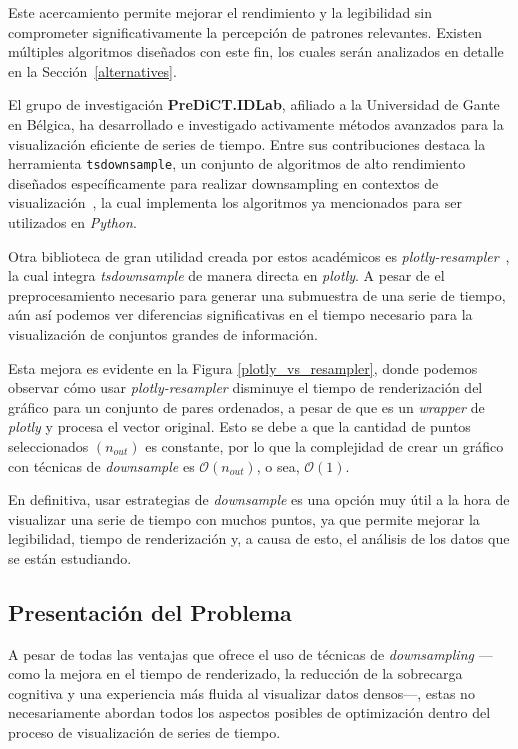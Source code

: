 Este acercamiento permite mejorar el rendimiento y la legibilidad sin comprometer significativamente la percepción de patrones relevantes. Existen múltiples algoritmos diseñados con este fin, los cuales serán analizados en detalle en la Sección~\ref{alternatives}.

\squashedplot
\downsample

El grupo de investigación \textbf{PreDiCT.IDLab}\cite{predict2025}, afiliado a la Universidad de Gante en Bélgica, ha desarrollado e investigado activamente métodos avanzados para la visualización eficiente de series de tiempo. Entre sus contribuciones destaca la herramienta \texttt{tsdownsample}, un conjunto de algoritmos de alto rendimiento diseñados específicamente para realizar downsampling en contextos de visualización~\cite{tsdownsample}, la cual implementa los algoritmos ya mencionados para ser utilizados en \textit{Python}.

Otra biblioteca de gran utilidad creada por estos académicos es \textit{plotly-resampler}~\cite{plotly-resampler}, la cual integra \textit{tsdownsample} de manera directa en \textit{plotly}. A pesar de el preprocesamiento necesario para generar una submuestra de una serie de tiempo, aún así podemos ver diferencias significativas en el tiempo necesario para la visualización de conjuntos grandes de información.

Esta mejora es evidente en la Figura \ref{plotly_vs_resampler}, donde podemos observar cómo usar \textit{plotly-resampler} disminuye el tiempo de renderización del gráfico para un conjunto de pares ordenados, a pesar de que es un \textit{wrapper} de \textit{plotly} y procesa el vector original. Esto se debe a que la cantidad de puntos seleccionados $(n_{out})$ es constante, por lo que la complejidad de crear un gráfico con técnicas de \textit{downsample} es $\mathcal{O}(n_{out})$, o sea, $\mathcal{O}(1)$.

\plotlyresampler

En definitiva, usar estrategias de \textit{downsample} es una opción muy útil a la hora de visualizar una serie de tiempo con muchos puntos, ya que permite mejorar la legibilidad, tiempo de renderización y, a causa de esto, el análisis de los datos que se están estudiando.

\subsection{Presentación del Problema}

A pesar de todas las ventajas que ofrece el uso de técnicas de \textit{downsampling} —como la mejora en el tiempo de renderizado, la reducción de la sobrecarga cognitiva y una experiencia más fluida al visualizar datos densos—, estas no necesariamente abordan todos los aspectos posibles de optimización dentro del proceso de visualización de series de tiempo.

